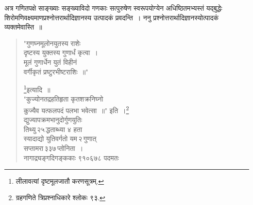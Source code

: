 \documentclass[11pt, openany]{book}
\begin{document}
\vspace{-3mm}
 अत्र गणितपक्षे साङ्ख्याः सङ्ख्याविदो गणकाः सत्पुरुषेण स्वरूपयोग्येन 
अधिष्ठितमभ्यस्तं यद्बुद्धेः शिरोमणिवक्ष्यमाणप्रश्नोत्तरार्थादिज्ञानस्य
उत्पादकं प्रवदन्ति~। ननु प्रश्नोत्तरार्थादिज्ञानस्योत्पादकं व्यक्तमेवास्ति~॥ 


\begin{quote}
    {\qt

 "गुणघ्नमूलोनयुतस्य राशेः \\

\vspace{-7mm}
\hspace{1cm} दृष्टस्य युक्तस्य गुणार्धं कृत्वा~। \\

\vspace{-7mm}
 मूलं गुणार्धेन युतं विहीनं \\

\vspace{-7mm}
\hspace{1cm} वर्गीकृतं प्रष्टुरभीष्टराशिः~॥"} \renewcommand{\thefootnote}{*}\footnote{लीलावत्यां दृष्टमूलजातौ करणसूत्रम्.}इत्यादि~॥\\

 \vspace{-5mm}
{\qt "कुज्योनतद्रहतिहृता कृतशक्रनिघ्नो \\

\vspace{-7mm}
\hspace{1cm} कुज्यैव यत्फलपदं पलभा भवेत्सा~॥"} इति~।\renewcommand{\thefootnote}{$\dag$}\footnote{ ग्रहगणिते त्रिप्रश्नाधिकारे श्लोकः ९३. }\\

\vspace{-5mm}
{\qt द्युज्यापक्रमभानुदोर्गुणयुतिः\\
 
 \vspace{-7mm}
\hspace{1cm} तिथ्यु\textendash \,२५\textendash \,द्धताब्ध्या ४ हता \\
 
 \vspace{-7mm}
 स्यादाद्यो युतिवर्गतो यम\textendash \,२\textendash \,गुणात् \\
 
 \vspace{-7mm}
\hspace{1cm} सप्तामरा\textendash \,३३७\textendash \,प्तोनिता~। \\

\vspace{-7mm}
 नागाद्र्यङ्गदिगङ्ककाः ९१०६७८ पदमतः \\
 
}
\end{quote}
\end{document}
